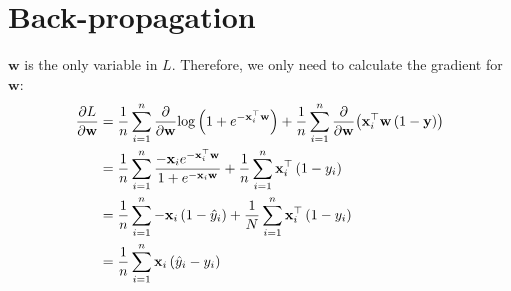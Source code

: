 \documentclass{article}
\begin{document}
\section{Back-propagation}
$\mathbf{w}$ is the only variable in $L$. Therefore, we only need to calculate the gradient for $\mathbf{w}$:
\begin{align}
    \frac{\partial L}{\partial\mathbf{w}} &= \frac{1}{n}\sum_{i = 1}^{n}{\frac{\partial}{\partial\mathbf{w}}{\log\left(1 + e^{-\mathbf{x}^\top_i\mathbf{w}}\right)}} + \frac{1}{n}\sum_{i = 1}^{n}{\frac{\partial}{\partial\mathbf{w}}{\left(\mathbf{x}^\top_i\mathbf{w}\left(1 - \mathbf{y}\right)\right)}} \\
    &= \frac{1}{n}\sum_{i = 1}^{n}{\frac{-\mathbf{x}_ie^{-\mathbf{x}^\top_i\mathbf{w}}}{1 + e^{-\mathbf{x}_i\mathbf{w}}}} +  \frac{1}{n}\sum_{i = 1}^{n}{\mathbf{x}_i^\top\left(1 - y_i\right)} \\
    &= \frac{1}{n}\sum_{i = 1}^{n}{-\mathbf{x}_i\left(1 - \hat{y}_i\right)} + \frac{1}{N}\sum_{i = 1}^{n}{\mathbf{x}_i^\top\left(1 - y_i\right)} \\
    &= \frac{1}{n}\sum_{i = 1}^{n}{\mathbf{x}_i\left(\hat{y}_i - y_i\right)}
\end{align}
\end{document}
